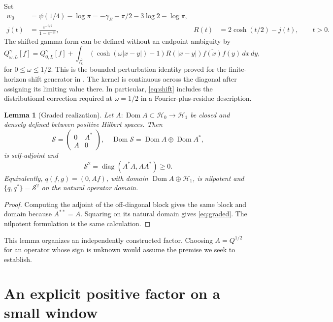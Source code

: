 \documentclass[11pt]{article}
\numberwithin{equation}{section}
\newtheorem{lemma}[theorem]{Lemma}
\theoremstyle{definition}
\theoremstyle{remark}
\newcommand{\HH}{\mathcal H}
\newcommand{\Qgam}{Q^{\gamma}}
\DeclareMathOperator{\Dom}{Dom}
\DeclareMathOperator{\diag}{diag}
\begin{document}
Set
\begin{align}
w_0&=\psi(1/4)-\log\pi
=-\gamma_E-\pi/2-3\log2-\log\pi,\label{eq:w0}\\
j(t)&=\frac{e^{-t/2}}{1-e^{-2t}},
& R(t)&=2\cosh(t/2)-j(t),\qquad t>0.\label{eq:jR}
\end{align}
The shifted gamma form can be defined without an endpoint ambiguity by
\begin{equation}
\Qgam_{\omega,L}[f]=\Qgam_{0,L}[f]
+\int_{I_L^2}(\cosh(\omega|x-y|)-1)R(|x-y|)
\overline{f(x)}f(y)\,dx\,dy,
\label{eq:shift}
\end{equation}
for $0\leq\omega\leq1/2$. This is the bounded perturbation identity proved
for the finite-horizon shift generator in \cite{BakerFirst}. The kernel is
continuous across the diagonal after assigning its limiting value there.
In particular, \eqref{eq:shift} includes the distributional correction
required at $\omega=1/2$ in a Fourier-plus-residue description.

\begin{lemma}[Graded realization]\label{lem:graded}
Let $A:\Dom A\subset\HH_0\to\HH_1$ be closed and densely defined between
positive Hilbert spaces. Then
\begin{equation}
\mathscr S=\begin{pmatrix}0&A^*\\A&0\end{pmatrix},
\quad \Dom\mathscr S=\Dom A\oplus\Dom A^*,
\end{equation}
is self-adjoint and
\begin{equation}
\mathscr S^2=\diag(A^*A,AA^*)\geq0.
\label{eq:graded}
\end{equation}
Equivalently, $q(f,g)=(0,Af)$, with domain $\Dom A\oplus\HH_1$,
is nilpotent and $\{q,q^*\}=\mathscr S^2$ on the natural operator domain.
\end{lemma}
\begin{proof}
Computing the adjoint of the off-diagonal block gives the same block and
domain because $A^{**}=A$. Squaring on its natural domain gives
\eqref{eq:graded}. The nilpotent formulation is the same calculation.
\end{proof}

This lemma organizes an independently constructed factor. Choosing
$A=Q^{1/2}$ for an operator whose sign is unknown would assume the premise
we seek to establish.

\section{An explicit positive factor on a small window}
\label{sec:small}
\end{document}
